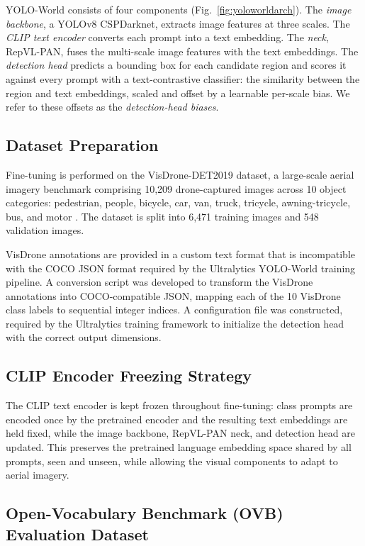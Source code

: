 \documentclass[conf]{new-aiaa}
\begin{document}
YOLO-World consists of four components (Fig.~\ref{fig:yoloworldarch}). The \emph{image
backbone}, a YOLOv8 CSPDarknet, extracts image features at three scales. The \emph{CLIP text
encoder} converts each prompt into a text embedding. The \emph{neck}, RepVL-PAN, fuses the
multi-scale image features with the text embeddings. The \emph{detection head} predicts a
bounding box for each candidate region and scores it against every prompt with a
text-contrastive classifier: the similarity between the region and text embeddings, scaled
and offset by a learnable per-scale bias. We refer to these offsets as the
\emph{detection-head biases}.

\subsection{Dataset Preparation}

Fine-tuning is performed on the VisDrone-DET2019 dataset, a large-scale aerial imagery benchmark comprising 10,209 drone-captured images across 10 object categories: pedestrian, people, bicycle, car, van, truck, tricycle, awning-tricycle, bus, and motor \cite{zhu2021detection}. The dataset is split into 6,471 training images and 548 validation images. 

VisDrone annotations are provided in a custom text format that is incompatible with the COCO JSON format required by the Ultralytics YOLO-World training pipeline. A conversion script was developed to transform the VisDrone annotations into COCO-compatible JSON, mapping each of the 10 VisDrone class labels to sequential integer indices. A configuration file was constructed, required by the Ultralytics \cite{ultralytics2023} training framework to initialize the detection head with the correct output dimensions.

\subsection{CLIP Encoder Freezing Strategy}

The CLIP text encoder is kept frozen throughout fine-tuning: class prompts are encoded once
by the pretrained encoder and the resulting text embeddings are held fixed, while the image
backbone, RepVL-PAN neck, and detection head are updated. This preserves the pretrained
language embedding space shared by all prompts, seen and unseen, while allowing the visual
components to adapt to aerial imagery. 


\subsection{Open-Vocabulary Benchmark (OVB) Evaluation Dataset}
\label{sec:ovb}
\end{document}
